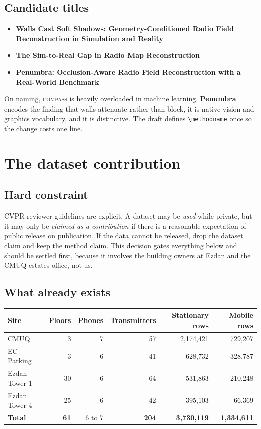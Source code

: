 \documentclass[11pt,a4paper]{article}
\begin{document}
\subsection{Candidate titles}

\begin{itemize}
\item \textbf{Walls Cast Soft Shadows: Geometry-Conditioned Radio Field Reconstruction
in Simulation and Reality}
\item \textbf{The Sim-to-Real Gap in Radio Map Reconstruction}
\item \textbf{Penumbra: Occlusion-Aware Radio Field Reconstruction with a Real-World
Benchmark}
\end{itemize}

On naming, \textsc{compass} is heavily overloaded in machine learning.
\textbf{Penumbra} encodes the finding that walls attenuate rather than block, it is
native vision and graphics vocabulary, and it is distinctive. The draft defines
\texttt{\textbackslash methodname} once so the change costs one line.

\section{The dataset contribution}

\subsection{Hard constraint}

CVPR reviewer guidelines are explicit. A dataset may be \emph{used} while private, but it
may only be \emph{claimed as a contribution} if there is a reasonable expectation of
public release on publication. If the data cannot be released, drop the dataset claim and
keep the method claim. This decision gates everything below and should be settled first,
because it involves the building owners at Ezdan and the CMUQ estates office, not us.

\subsection{What already exists}

\begin{center}
\small
\begin{tabular}{lrrrrr}
\toprule
Site & Floors & Phones & Transmitters & Stationary rows & Mobile rows \\
\midrule
CMUQ & 3 & 7 & 57 & 2{,}174{,}421 & 729{,}207 \\
EC Parking & 3 & 6 & 41 & 628{,}732 & 328{,}787 \\
Ezdan Tower 1 & 30 & 6 & 64 & 531{,}863 & 210{,}248 \\
Ezdan Tower 4 & 25 & 6 & 42 & 395{,}103 & 66{,}369 \\
\midrule
\textbf{Total} & \textbf{61} & 6 to 7 & \textbf{204} & \textbf{3{,}730{,}119} & \textbf{1{,}334{,}611} \\
\bottomrule
\end{tabular}
\end{center}
\end{document}
